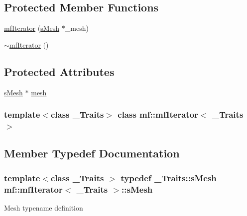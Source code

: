 \subsection*{Protected Member Functions}
\begin{DoxyCompactItemize}
\item 
\hyperlink{classmf_1_1mfIterator_a449e71efbd66d915eb9fb9be7de1b9ca}{mfIterator} (\hyperlink{classmf_1_1mfIterator_aca31e4d7e7eca4e3b100530d8725064b}{sMesh} $\ast$\_\-mesh)
\item 
\hyperlink{classmf_1_1mfIterator_abf1ee78fa042174107d215ba0da8bc8f}{$\sim$mfIterator} ()
\end{DoxyCompactItemize}
\subsection*{Protected Attributes}
\begin{DoxyCompactItemize}
\item 
\hyperlink{classmf_1_1mfIterator_aca31e4d7e7eca4e3b100530d8725064b}{sMesh} $\ast$ \hyperlink{classmf_1_1mfIterator_a605ced32b4a7f8a90a3cc947d9cd431b}{mesh}
\end{DoxyCompactItemize}
\subsubsection*{template$<$class \_\-Traits$>$ class mf::mfIterator$<$ \_\-Traits $>$}



\subsection{Member Typedef Documentation}
\hypertarget{classmf_1_1mfIterator_aca31e4d7e7eca4e3b100530d8725064b}{
\subsubsection[{sMesh}]{\setlength{\rightskip}{0pt plus 5cm}template$<$class \_\-Traits $>$ typedef \_\-Traits::sMesh {\bf mf::mfIterator}$<$ \_\-Traits $>$::{\bf sMesh}}}
\label{classmf_1_1mfIterator_aca31e4d7e7eca4e3b100530d8725064b}
Mesh typename definition 

